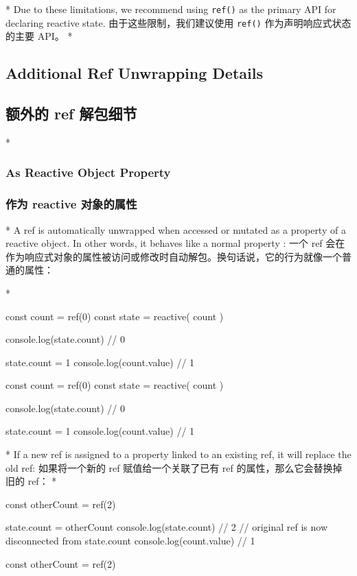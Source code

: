 \begin{paracol}{2}
\switchcolumn[0]*%
Due to these limitations, we recommend using \texttt{ref()} as the
primary API for declaring reactive state.
\switchcolumn
由于这些限制，我们建议使用 \texttt{ref()} 作为声明响应式状态的主要 API。
\switchcolumn[0]*%
\subsection{Additional Ref Unwrapping Details}
\switchcolumn
\subsection{额外的 ref 解包细节}
\switchcolumn[0]*%
\subsubsection{As Reactive Object Property}
\switchcolumn
\subsubsection{作为 reactive 对象的属性}
\switchcolumn[0]*%
A ref is automatically unwrapped when accessed or mutated as a property
of a reactive object. In other words, it behaves like a normal property
:
\switchcolumn
一个 ref
会在作为响应式对象的属性被访问或修改时自动解包。换句话说，它的行为就像一个普通的属性：

\switchcolumn[0]*%
\begin{codeJs}
const count = ref(0)
const state = reactive({
    count
})

console.log(state.count) // 0

state.count = 1
console.log(count.value) // 1
\end{codeJs}
\switchcolumn
\begin{codeJs}
const count = ref(0)
const state = reactive({
    count
})

console.log(state.count) // 0

state.count = 1
console.log(count.value) // 1
\end{codeJs}
\switchcolumn[0]*%
If a new ref is assigned to a property linked to an existing ref, it
will replace the old ref:
\switchcolumn
如果将一个新的 ref 赋值给一个关联了已有 ref 的属性，那么它会替换掉旧的
ref：
\switchcolumn[0]*%
\begin{codeJs}
const otherCount = ref(2)

state.count = otherCount
console.log(state.count) // 2
// original ref is now disconnected from state.count
console.log(count.value) // 1
\end{codeJs}
\switchcolumn
\begin{codeJs}
const otherCount = ref(2)


\end{codeJs}
\end{paracol}
